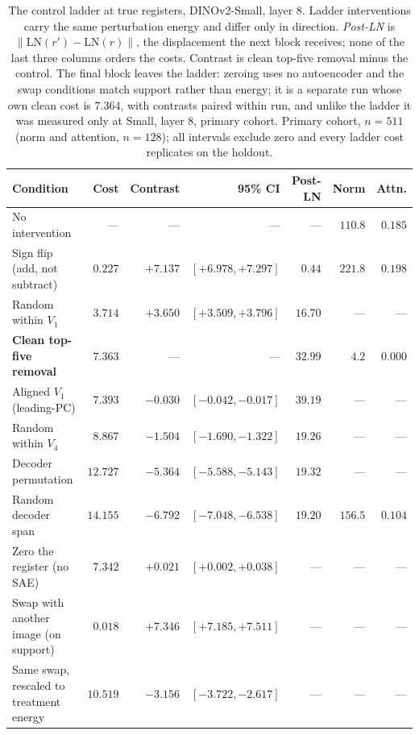 \documentclass{article}
\begin{document}
\begin{table}[t]
\centering
\caption{The control ladder at true registers, DINOv2-Small, layer 8. Ladder interventions carry the same perturbation energy and differ only in direction. \emph{Post-LN} is $\|\mathrm{LN}(r')-\mathrm{LN}(r)\|$, the displacement the next block receives; none of the last three columns orders the costs. Contrast is clean top-five removal minus the control. The final block leaves the ladder: zeroing uses no autoencoder and the swap conditions match support rather than energy; it is a separate run whose own clean cost is $7.364$, with contrasts paired within run, and unlike the ladder it was measured only at Small, layer 8, primary cohort. Primary cohort, $n=511$ (norm and attention, $n=128$); all intervals exclude zero and every ladder cost replicates on the holdout.}
\label{tab:ladder}
\footnotesize
\setlength{\tabcolsep}{3.5pt}
\begin{tabular}{lrrrrrr}
\toprule
Condition & Cost & Contrast & 95\% CI & Post-LN & Norm & Attn. \\
\midrule
No intervention                 & ---      & ---      & ---                & ---      & $110.8$ & $0.185$ \\
Sign flip (add, not subtract)   & $0.227$  & $+7.137$ & $[+6.978, +7.297]$ & $0.44$   & $221.8$ & $0.198$ \\
Random within $V_1$             & $3.714$  & $+3.650$ & $[+3.509, +3.796]$ & $16.70$  & ---     & ---     \\
\textbf{Clean top-five removal} & $7.363$  & ---      & ---                & $32.99$  & $4.2$   & $0.000$ \\
Aligned $V_1$ (leading-PC)      & $7.393$  & $-0.030$ & $[-0.042, -0.017]$ & $39.19$  & ---     & ---     \\
Random within $V_4$             & $8.867$  & $-1.504$ & $[-1.690, -1.322]$ & $19.26$  & ---     & ---     \\
Decoder permutation             & $12.727$ & $-5.364$ & $[-5.588, -5.143]$ & $19.32$  & ---     & ---     \\
Random decoder span             & $14.155$ & $-6.792$ & $[-7.048, -6.538]$ & $19.20$  & $156.5$ & $0.104$ \\
\midrule
Zero the register (no SAE)       & $7.342$  & $+0.021$ & $[+0.002, +0.038]$ & ---      & ---     & ---     \\
Swap with another image (on support) & $0.018$ & $+7.346$ & $[+7.185, +7.511]$ & ---   & ---     & ---     \\
Same swap, rescaled to treatment energy & $10.519$ & $-3.156$ & $[-3.722, -2.617]$ & --- & ---   & ---     \\
\bottomrule
\end{tabular}
\end{table}
\end{document}

